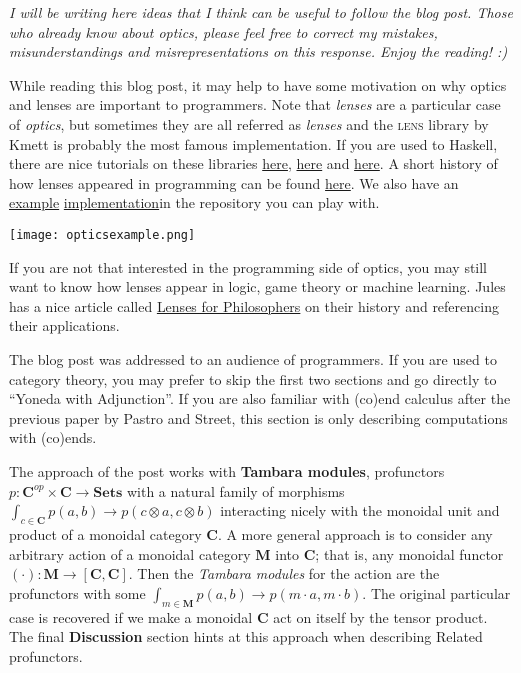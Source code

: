 \documentclass{amsart}
\begin{document}
\textit{I will be writing here ideas that I think can be useful to
  follow the blog post. Those who already know about optics, please
  feel free to correct my mistakes, misunderstandings and
  misrepresentations on this response. Enjoy the reading! :)}

While reading this blog post, it may help to have some motivation on
why optics and lenses are important to programmers.  Note that
\textit{lenses} are a particular case of \textit{optics}, but
sometimes they are all referred as \textit{lenses} and the
\textsc{lens} library by Kmett is probably the most famous implementation. If
you are used to Haskell, there are nice tutorials on these libraries
\href{https://hackage.haskell.org/package/lens-tutorial-1.0.3/docs/Control-Lens-Tutorial.html}{here},
\href{https://github.com/emilypi/lets-lens}{here} and
\href{http://www.haskellforall.com/2013/05/program-imperatively-using-haskell.html}{here}.
A short history of how lenses appeared in programming can be found \href{https://github.com/ekmett/lens/wiki/History-of-Lenses}{here}.
We also have an
\href{https://github.com/danielmichaelcicala/act2019/blob/master/profunctor-optics/categoricalview/TambaraOptics.hs}{example}
\href{https://github.com/danielmichaelcicala/act2019/blob/master/profunctor-optics/categoricalview/TambaraOpticsExample.hs}{implementation}in the repository you can play with.

\begin{center}
  \texttt{[image: opticsexample.png]}
\end{center}


If you are not that interested in the programming side of optics, you
may still want to know how lenses appear in logic, game theory or
machine learning. Jules has a nice article called
\href{https://julesh.com/2018/08/16/lenses-for-philosophers/}{Lenses
  for Philosophers} on their history and referencing their
applications.

The blog post was addressed to an audience of programmers. If you are
used to category theory, you may prefer to skip the first two sections
and go directly to ``Yoneda with Adjunction''.  If you are also
familiar with (co)end calculus after the previous paper by Pastro and
Street, this section is only describing computations with (co)ends.

The approach of the post works with \textbf{Tambara modules},
profunctors
$p \colon \mathbf{C}^{op} \times \mathbf{C} \to
\mathbf{Sets}$ with a natural family of morphisms
$\int_{c \in \mathbf{C}} p(a,b) \to p(c \otimes a , c \otimes b)$ interacting nicely with the
monoidal unit and product of a monoidal category $\mathbf{C}$.  A more
general approach is to consider any arbitrary action of a monoidal
category $\mathbf{M}$ into $\mathbf{C}$; that is, any monoidal functor
$(\cdot) \colon \mathbf{M} \to [ \mathbf{C} ,\mathbf{C} ]$.  Then the
\textit{Tambara modules} for the action are the profunctors with some
$\int_{m \in \mathbf{M}} p(a,b) \to p(m \cdot a, m \cdot b)$.  The original
particular case is recovered if we make a monoidal $\mathbf{C}$ act on itself by
the tensor product. The
final \textbf{Discussion} section hints at this approach when describing
\textsf{Related} profunctors.
\end{document}
